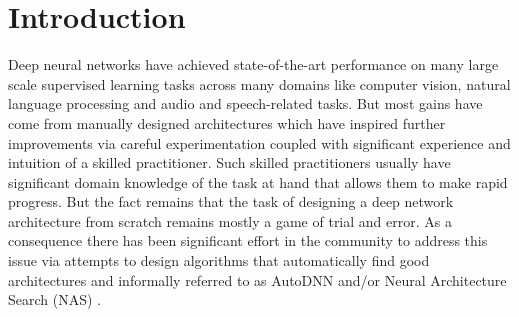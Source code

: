 

\section{Introduction}
\label{sec:nas_introduction}

Deep neural networks have achieved state-of-the-art performance on many large scale supervised learning tasks across many domains like computer vision, natural language processing and audio and speech-related tasks. But most gains have come from manually designed architectures which have inspired further improvements via careful experimentation coupled with significant experience and intuition of a skilled practitioner. Such skilled practitioners usually have significant domain knowledge of the task at hand that allows them to make rapid progress. But the fact remains that the task of designing a deep network architecture from scratch remains mostly a game of trial and error. As a consequence there has been significant effort in the community to address this issue via attempts to design algorithms that automatically find good architectures and informally referred to as AutoDNN and/or Neural Architecture Search (NAS) \cite{nas}. 

